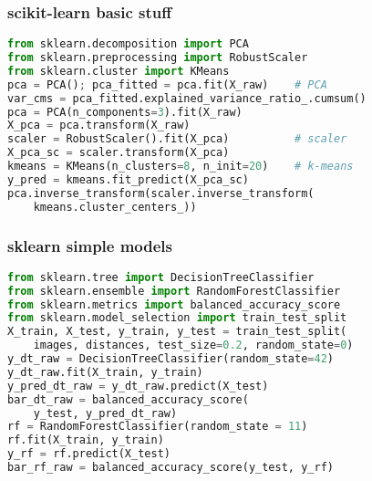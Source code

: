 \subsubsection{scikit-learn basic stuff}
\begin{footnotesize}
    \begin{lstlisting}[language=Python]
from sklearn.decomposition import PCA
from sklearn.preprocessing import RobustScaler
from sklearn.cluster import KMeans
pca = PCA(); pca_fitted = pca.fit(X_raw)    # PCA
var_cms = pca_fitted.explained_variance_ratio_.cumsum()
pca = PCA(n_components=3).fit(X_raw)
X_pca = pca.transform(X_raw)
scaler = RobustScaler().fit(X_pca)          # scaler
X_pca_sc = scaler.transform(X_pca)
kmeans = KMeans(n_clusters=8, n_init=20)    # k-means
y_pred = kmeans.fit_predict(X_pca_sc)
pca.inverse_transform(scaler.inverse_transform(
    kmeans.cluster_centers_))
\end{lstlisting}
\end{footnotesize}

\subsubsection{sklearn simple models}
\begin{footnotesize}
    \begin{lstlisting}[language=Python]
from sklearn.tree import DecisionTreeClassifier
from sklearn.ensemble import RandomForestClassifier
from sklearn.metrics import balanced_accuracy_score
from sklearn.model_selection import train_test_split
X_train, X_test, y_train, y_test = train_test_split(
    images, distances, test_size=0.2, random_state=0)
y_dt_raw = DecisionTreeClassifier(random_state=42)  
y_dt_raw.fit(X_train, y_train)
y_pred_dt_raw = y_dt_raw.predict(X_test)
bar_dt_raw = balanced_accuracy_score(
    y_test, y_pred_dt_raw)
rf = RandomForestClassifier(random_state = 11)      
rf.fit(X_train, y_train)
y_rf = rf.predict(X_test)
bar_rf_raw = balanced_accuracy_score(y_test, y_rf)
\end{lstlisting}
\end{footnotesize}



